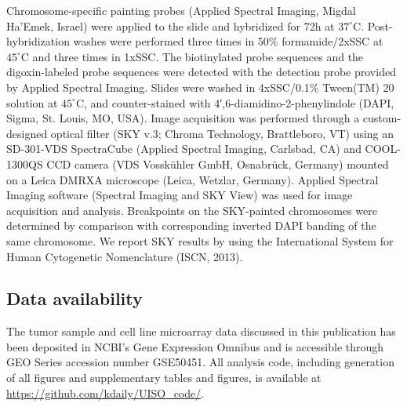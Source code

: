 \documentclass[10pt]{article}
\begin{document}
Chromosome-specific painting probes (Applied Spectral Imaging, Migdal Ha’Emek, Israel) were applied to the slide and hybridized for 72h at $37^{\circ}\mathrm{C}$.
Post-hybridization washes were performed three times in 50\% formamide/2xSSC at $45^{\circ}\mathrm{C}$ and three times in 1xSSC.
The biotinylated probe sequences and the digoxin-labeled probe sequences were detected with the detection probe provided by Applied Spectral Imaging.
Slides were washed in 4xSSC/0.1\% Tween(TM) 20 solution at $45^{\circ}\mathrm{C}$, and counter-stained with 4′,6-diamidino-2-phenylindole (DAPI, Sigma, St. Louis, MO, USA).
Image acquisition was performed through a custom-designed optical filter (SKY v.3; Chroma Technology, Brattleboro, VT) using an SD-301-VDS SpectraCube (Applied Spectral Imaging, Carlsbad, CA) and COOL-1300QS CCD camera (VDS Vosskühler GmbH, Osnabrück, Germany) mounted on a Leica DMRXA microscope (Leica, Wetzlar, Germany).
Applied Spectral Imaging software (Spectral Imaging and SKY View) was used for image acquisition and analysis.
Breakpoints on the SKY-painted chromosomes were determined by comparison with corresponding inverted DAPI banding of the same chromosome.
We report SKY results by using the International System for Human Cytogenetic Nomenclature (ISCN, 2013).

\subsection*{Data availability}
The tumor sample and cell line microarray data discussed in this publication has been deposited in NCBI's Gene Expression Omnibus \citep{Edgar2002Gene} and is accessible through GEO Series accession number GSE50451.
All analysis code, including generation of all figures and supplementary tables and figures, is available at \url{https://github.com/kdaily/UISO\_code/}.



\end{document}
